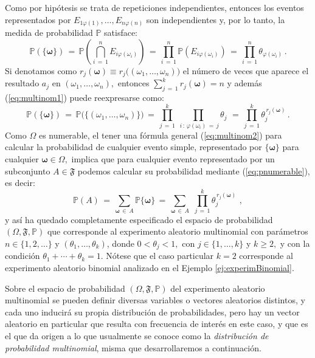 \documentclass[spanish,10pt,letterpaper]{article}
\newcommand{\prob}{\mathbb{P}}
\begin{document}
Como por hipótesis se trata de repeticiones independientes, entonces los eventos representados por $E_{1\varphi(1)},\ldots,E_{n\varphi(n)}$ son independientes y, por lo tanto, la medida de probabilidad $\prob$ satisface:
\begin{equation}\label{eq:multinom1}
    \prob(\{\boldsymbol{\omega}\}) \,=\, \prob\left( \bigcap_{i\,=\,1}^n E_{i\varphi(\omega_i)} \right) \,=\, \prod_{i\,=\,1}^n\prob(E_{i\varphi(\omega_i)}) \,=\, \prod_{i\,=\,1}^n\theta_{\varphi(\omega_i)}\,. 
\end{equation}
Si denotamos como $r_j(\boldsymbol{\omega})\equiv r_j\big((\omega_1,\ldots,\omega_n)\big)$ el número de veces que aparece el resultado $a_j$ en $(\omega_1,\ldots,\omega_n),$ entonces $\sum_{j\,=\,1}^k r_j(\boldsymbol{\omega})=n$ y además (\ref{eq:multinom1}) puede reexpresarse como:
\begin{equation}\label{eq:multinom2}
    \prob(\{\boldsymbol{\omega}\}) \,=\, \prob\big(\{(\omega_1,\ldots,\omega_n)\}\big) \,=\,\prod_{j\,=\,1}^k\prod_{\,\,i\,:\,\varphi(\omega_i)\,=\,j}\!\!\!\!\!\!\theta_j \,\,=\, \prod_{j\,=\,1}^k\theta_j^{\,r_j(\boldsymbol{\omega})}\,.
\end{equation}
Como $\Omega$ es numerable, el tener una fórmula general (\ref{eq:multinom2}) para calcular la probabilidad de cualquier evento simple, representado por $\{\boldsymbol{\omega}\}$ para cualquier $\boldsymbol{\omega}\in\Omega,$ implica que para cualquier evento representado por un subconjunto $A\in\mathfrak{F}$ podemos calcular su probabilidad mediante (\ref{eq:pnumerable}), es decir:
\begin{equation}
    \prob(A) \,=\, \sum_{\boldsymbol{\omega}\,\in\,A}\prob\{\boldsymbol{\omega}\} \,=\, \sum_{\boldsymbol{\omega}\,\in\,A}\,\,\prod_{j\,=\,1}^k\theta_j^{\,r_j(\boldsymbol{\omega})}\,\,,
\end{equation}
y así ha quedado completamente especificado el espacio de probabilidad $(\Omega,\mathfrak{F},\prob)$ que corresponde al experimento aleatorio multinomial con parámetros $n\in\{1,2,\ldots\}$ y $(\theta_1,\ldots,\theta_k)$, donde $0<\theta_j<1,$ con $j\in\{1,\ldots,k\}$ y $k\geq 2,$ y con la condición $\theta_1+\cdots+\theta_k=1.$ Nótese que el caso particular $k=2$ corresponde al experimento aleatorio binomial analizado en el Ejemplo \ref{ej:experimBinomial}.

\bigskip 

Sobre el espacio de probabilidad $(\Omega,\mathfrak{F},\prob)$ del experimento aleatorio multinomial se pueden definir diversas variables o vectores aleatorios distintos, y cada uno inducirá su propia distribución de probabilidades, pero hay un vector aleatorio en particular que resulta con frecuencia de interés en este caso, y que es el que da origen a lo que usualmente se conoce como la \textit{distribución de probabilidad multinomial}, misma que desarrollaremos a continuación.
\end{document}
